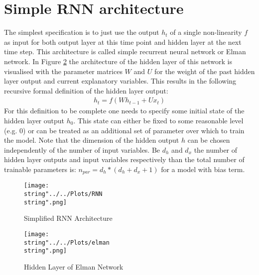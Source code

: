 \section{Simple RNN architecture}
The simplest specification is to just use the output $h_t$ of a single non-linearity $f$  as input for both output layer at this time point and hidden layer at the next time step. This architecture is called simple recurrent neural network or Elman network. In Figure \ref{fig:elman} the architecture of the hidden layer of this network is visualised with the parameter matrices $W$ and $U$ for the weight of the past hidden layer output and current explanatory variables. This results in the following recursive formal definition of the hidden layer output:
\begin{align*}
h_t = f(Wh_{t-1} + Ux_t)
\end{align*}
For this definition to be complete one needs to specify some initial state of the hidden layer output $h_0$. This state can either be fixed to some reasonable level (e.g. 0) or can be treated as an additional set of parameter over which to train the model.
Note that the dimension of the hidden output $h$ can be chosen independently of the number of input variables. Be $d_h$ and $d_x$ the number of hidden layer outputs and input variables respectively than the total number of trainable parameters is: $n_{par} = d_h * (d_h + d_x + 1)$ for a model with bias term.

\begin{figure}
  \centering
\texttt{[image: \\string"../../Plots/RNN\\string".png]}
  \caption{Simplified RNN Architecture}\label{fig:RNN}
\end{figure}

\begin{figure}
  \centering
\texttt{[image: \\string"../../Plots/elman\\string".png]}
  \caption{Hidden Layer of Elman Network}\label{fig:elman}
\end{figure}

